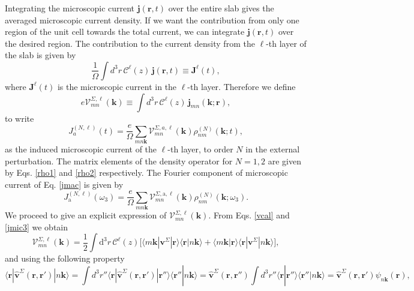 Integrating the microscopic current $\mathbf{j}(\mathbf{r},t)$ over
the entire slab gives the averaged microscopic current density. 
If we want the contribution from only one region of the unit cell 
towards the total current, we can integrate $\mathbf{j}({\mathbf r},t)$ 
over the desired region. The contribution to the current density from the
$\ell$-th layer of the slab is given by
\begin{equation}\label{jsz}
\frac{1}{\Omega}\int d^3r\, \mathcal{C}^{\ell}(z)\, \mathbf{j}(\mathbf{r},t)
 \equiv \mathbf{J}^{\ell}(t),
\end{equation}
where $\mathbf{J}^{\ell}(t)$ is the microscopic current in the
$\ell$-th layer.
Therefore we define
\begin{equation}\label{vcal}
e{\boldsymbol{\mathcal{V}}}^{\Sigma,\ell}_{mn}(\mathbf{k})
\equiv
\int d^3r\, \mathcal{C}^{\ell}(z)\,\mathbf{j}_{mn}({\mathbf{k}};\mathbf{r}),
\end{equation}
to write
\begin{equation}\label{jmac}
J_a^{(N,\ell)}(t)=\frac{e}{\Omega}
\sum_{mn\mathbf{k}}
\mathcal{V}^{\Sigma,a,\ell}_{mn}(\mathbf{k})
\rho^{(N)}_{nm}(\mathbf{k};t),
\end{equation}
as the induced microscopic current of the $\ell$-th layer, to order $N$ 
in the external perturbation. The matrix elements of the 
density operator for $N=1,2$ are given by Eqs. \eqref{rho1} and
\eqref{rho2} respectively. 
The Fourier component of microscopic current of Eq. \eqref{jmac} is given by
\begin{equation}\label{jmac2}
J_{\mathrm{a}}^{(N,\ell)}(\omega_3)=\frac{e}{\Omega}
\sum_{mn\mathbf{k}}
\mathcal{V}^{\Sigma,\mathrm{a},\ell}_{mn}(\mathbf{k})
\rho^{(N)}_{nm}(\mathbf{k};\omega_3)
.
\end{equation}
We proceed to give an explicit expression of
$\boldsymbol{\mathcal{V}}^{\Sigma,\ell}_{mn}(\mathbf{k})$.
From
Eqs. \eqref{vcal} and \eqref{jmic3} we obtain
\begin{equation}\label{intj}
{\boldsymbol{\mathcal{V}}}^{\Sigma,\ell}_{mn}({\mathbf k})=
\frac{1}{2}
\int \mathrm{d}^3 r\,
 \mathcal{C}^{\ell}(z)
\bigg[
\langle m\mathbf{k}|\mathbf{v}^\Sigma | \mathbf{r}\rangle
\langle \mathbf{r} | n \mathbf k \rangle +
\langle m\mathbf{k} | \mathbf{r}\rangle
\langle \mathbf{r} | \mathbf{v}^\Sigma | n \mathbf k \rangle\bigg]
,
\end{equation}  
and using the following property
\begin{equation}\label{nl.2}
\langle \mathbf{r} | \hat{\mathbf{v}}^{\Sigma}(\mathbf{r},\mathbf{r}')| n\mathbf{k} \rangle
=\int d^3 r'' \langle\mathbf{r}|\hat{\mathbf{v}}^{\Sigma}(\mathbf{r},\mathbf{r}')|\mathbf{r}''\rangle
\langle\mathbf{r}''|n\mathbf{k}\rangle
=\hat{\mathbf{v}}^{\Sigma}(\mathbf{r},\mathbf{r}'')
\int d^3 r'' \langle\mathbf{r}|\mathbf{r}''\rangle
\langle\mathbf{r}''|n\mathbf{k}\rangle
=\hat{\mathbf{v}}^{\Sigma}(\mathbf{r},\mathbf{r}')
\psi_{n\mathbf{k}}(\mathbf{r})
,
\end{equation}
